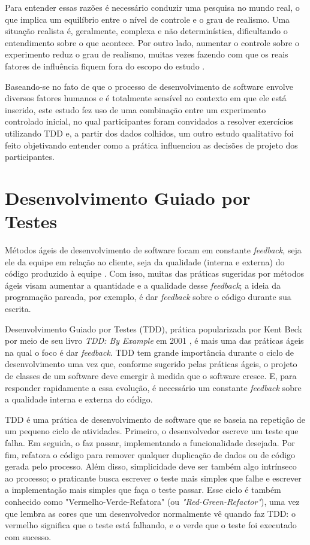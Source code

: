 \documentclass[conference]{IEEEtran}
\begin{document}
Para entender essas razões é necessário
conduzir uma pesquisa no mundo real, o que  
implica um equilíbrio entre o nível de controle
e o grau de realismo. Uma situação realista é, geralmente, complexa e 
não determinística, dificultando o entendimento sobre o que acontece. Por outro
lado, aumentar o controle sobre o experimento reduz o grau de realismo, muitas
vezes fazendo com que os reais fatores de influência fiquem fora do escopo do 
estudo \cite{guidelines-case-study}.

Baseando-se no fato de que o processo de desenvolvimento de software envolve 
diversos fatores humanos e é totalmente sensível ao contexto em que ele está 
inserido, 
este estudo fez uso de uma combinação entre um experimento controlado inicial, 
no qual participantes foram convidados a resolver exercícios utilizando TDD e, 
a partir dos dados colhidos, um outro estudo qualitativo foi 
feito objetivando entender como a prática influenciou as decisões de projeto 
dos participantes.

\section{Desenvolvimento Guiado por Testes}

Métodos ágeis de desenvolvimento de software focam em constante
\textit{feedback}, seja ele da equipe em relação ao cliente, seja da
qualidade (interna e externa) do código produzido à equipe \cite{AgileManifesto}.
Com isso, muitas das práticas sugeridas por métodos ágeis visam aumentar a 
quantidade e a qualidade desse \textit{feedback}; a ideia da programação pareada, por
exemplo, é dar \textit{feedback} sobre o código durante sua escrita.

Desenvolvimento Guiado por Testes (TDD), prática popularizada por Kent Beck por meio de seu livro
\textit{TDD: By Example} em 2001 \cite{TDDByExample}, é mais uma das práticas
ágeis na qual o foco é dar \textit{feedback}. TDD tem grande importância durante o ciclo
de desenvolvimento uma vez que, conforme sugerido pelas práticas ágeis, o projeto de classes de um
software deve emergir à medida que o software cresce. E, para responder
rapidamente a essa evolução, é necessário um constante \textit{feedback} sobre a
qualidade interna e externa do código.

TDD é uma prática de desenvolvimento de software que se baseia na repetição de
um pequeno ciclo de atividades. Primeiro, o desenvolvedor escreve um
teste que falha. Em seguida, o faz passar, implementando a
funcionalidade desejada. Por fim, refatora o código para remover qualquer
duplicação de dados ou de código gerada pelo processo.
Além disso, simplicidade deve ser também algo intrínseco ao processo; o praticante
busca escrever o teste mais simples que falhe e escrever a implementação mais simples
que faça o teste passar.
Esse ciclo
é também conhecido como 
"Vermelho-Verde-Refatora" (ou \textit{"Red-Green-Refactor"}), uma vez que lembra as cores que um 
desenvolvedor normalmente vê quando faz TDD: o vermelho significa que
o teste está falhando, e o verde que o teste foi executado com sucesso.
\end{document}
